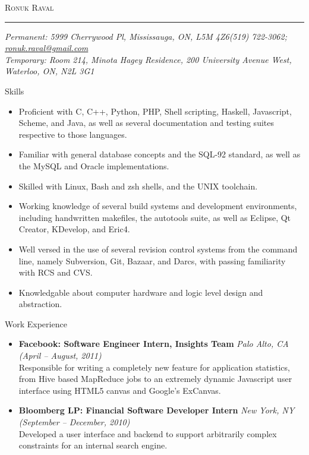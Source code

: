 \documentclass[11pt,oneside]{article}
\makeatletter
\newcommand{\name}{Ronuk Raval}
\newcommand{\permaddr}{5999 Cherrywood Pl, Mississauga, ON, L5M 4Z6}
\newcommand{\tempaddr}{
    Room 214,
    Minota Hagey Residence,
    200 University Avenue West,
    Waterloo, ON, N2L 3G1
}
\newcommand{\phone}{(519) 722-3062}
\newcommand{\email}{ronuk.raval@gmail.com}
\newcommand{\website}{http://zeroindexed.com}
\newcommand{\bigname}[1]{
    \begin{center}\fontfamily{phv}\selectfont\Huge\scshape#1\end{center}
}
\newcommand{\respara}[1]{
    \vspace{4pt}
    {\fontfamily{phv} \selectfont \Large #1} \\
    \vspace{4pt}
    \hspace{19pt}
}
\newenvironment{ressection}[1]{
    \respara{#1}
    \begin{itemize}
    \vspace{-20pt}
}{
    \end{itemize}
}
\newcommand{\resitem}[1]{
    \vspace{-4pt}
    \item \begin{flushleft} #1 \end{flushleft}
}
\newcommand{\resbigitem}[3]{
    \item
    \textbf{#1} \hfill \textit{#2} \\
    #3
}
\makeatother
\begin{document}
 \selectfont

\bigname{\name}

\vspace{-8pt} \rule{\textwidth}{1pt}

\vspace{-1pt} {\small\itshape Permanent: \permaddr \hfill \phone; \href{mailto:\email}{\email}\\
    Temporary: \tempaddr}%

\vspace{8 pt}



\begin{ressection}{Skills}

    \resitem{Proficient with C, C++, Python, PHP, Shell scripting, Haskell,
        Javascript, Scheme, and Java, as well as several documentation and testing
        suites respective to those languages.}

    \resitem{Familiar with general database concepts and the SQL-92 standard, as well
        as the MySQL and Oracle implementations.}

    \resitem{Skilled with Linux, Bash and zsh shells, and the UNIX toolchain.}

    \resitem{Working knowledge of several build systems and development environments,
        including handwritten makefiles, the autotools suite, as well as Eclipse,
        Qt Creator, KDevelop, and Eric4.}

    \resitem{Well versed in the use of several revision control systems from the command
        line, namely Subversion, Git, Bazaar, and Darcs, with passing familiarity with
        RCS and CVS.}

    \resitem{Knowledgable about computer hardware and logic level design and abstraction.}

\end{ressection}

\begin{ressection}{Work Experience}

    \resbigitem{Facebook: Software Engineer Intern, Insights Team}
        {Palo Alto, CA (April -- August, 2011)}
        {Responsible for writing a completely new feature for application
        statistics, from Hive based MapReduce jobs to an extremely dynamic
        Javascript user interface using HTML5 canvas and Google's ExCanvas.}

    \resbigitem{Bloomberg LP: Financial Software Developer Intern}
        {New York, NY (September -- December, 2010)}
        {Developed a user interface and backend to support arbitrarily complex
        constraints for an internal search engine.}

\end{ressection}
\end{document}
